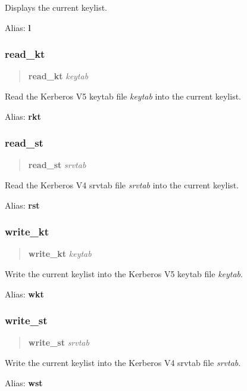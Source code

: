 \documentclass[letterpaper,10pt,english]{sphinxmanual}
\begin{document}
Displays the current keylist.

Alias: \textbf{l}


\subsubsection{read\_kt}
\label{admin/admin_commands/ktutil:read-kt}\begin{quote}

\textbf{read\_kt} \emph{keytab}
\end{quote}

Read the Kerberos V5 keytab file \emph{keytab} into the current keylist.

Alias: \textbf{rkt}


\subsubsection{read\_st}
\label{admin/admin_commands/ktutil:read-st}\begin{quote}

\textbf{read\_st} \emph{srvtab}
\end{quote}

Read the Kerberos V4 srvtab file \emph{srvtab} into the current keylist.

Alias: \textbf{rst}


\subsubsection{write\_kt}
\label{admin/admin_commands/ktutil:write-kt}\begin{quote}

\textbf{write\_kt} \emph{keytab}
\end{quote}

Write the current keylist into the Kerberos V5 keytab file \emph{keytab}.

Alias: \textbf{wkt}


\subsubsection{write\_st}
\label{admin/admin_commands/ktutil:write-st}\begin{quote}

\textbf{write\_st} \emph{srvtab}
\end{quote}

Write the current keylist into the Kerberos V4 srvtab file \emph{srvtab}.

Alias: \textbf{wst}
\end{document}
